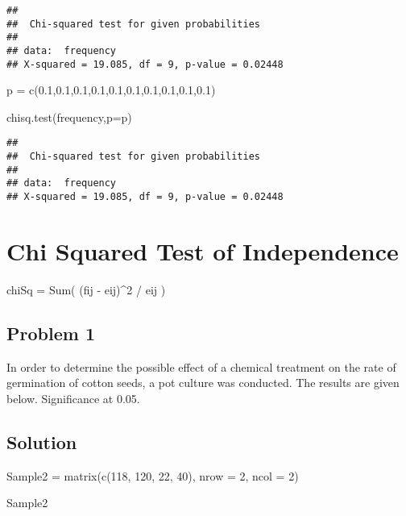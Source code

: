 \documentclass[
]{article}
\newenvironment{Shaded}{\begin{snugshade}}{\end{snugshade}}
\newcommand{\AttributeTok}[1]{\textcolor[rgb]{0.77,0.63,0.00}{#1}}
\newcommand{\DecValTok}[1]{\textcolor[rgb]{0.00,0.00,0.81}{#1}}
\newcommand{\FloatTok}[1]{\textcolor[rgb]{0.00,0.00,0.81}{#1}}
\newcommand{\FunctionTok}[1]{\textcolor[rgb]{0.00,0.00,0.00}{#1}}
\newcommand{\NormalTok}[1]{#1}
\newcommand{\OtherTok}[1]{\textcolor[rgb]{0.56,0.35,0.01}{#1}}
\begin{document}
\begin{verbatim}
## 
##  Chi-squared test for given probabilities
## 
## data:  frequency
## X-squared = 19.085, df = 9, p-value = 0.02448
\end{verbatim}

\begin{Shaded}
\begin{Highlighting}[]
\NormalTok{p }\OtherTok{=} \FunctionTok{c}\NormalTok{(}\FloatTok{0.1}\NormalTok{,}\FloatTok{0.1}\NormalTok{,}\FloatTok{0.1}\NormalTok{,}\FloatTok{0.1}\NormalTok{,}\FloatTok{0.1}\NormalTok{,}\FloatTok{0.1}\NormalTok{,}\FloatTok{0.1}\NormalTok{,}\FloatTok{0.1}\NormalTok{,}\FloatTok{0.1}\NormalTok{,}\FloatTok{0.1}\NormalTok{)}


\FunctionTok{chisq.test}\NormalTok{(frequency,}\AttributeTok{p=}\NormalTok{p)}
\end{Highlighting}
\end{Shaded}

\begin{verbatim}
## 
##  Chi-squared test for given probabilities
## 
## data:  frequency
## X-squared = 19.085, df = 9, p-value = 0.02448
\end{verbatim}

\hypertarget{chi-squared-test-of-independence}{%
\section{Chi Squared Test of
Independence}\label{chi-squared-test-of-independence}}

chiSq = Sum( (fij - eij)\^{}2 / eij )

\hypertarget{problem-1-3}{%
\subsection{Problem 1}\label{problem-1-3}}

In order to determine the possible effect of a chemical treatment on the
rate of germination of cotton seeds, a pot culture was conducted. The
results are given below. Significance at 0.05.

\hypertarget{solution-25}{%
\subsection{Solution}\label{solution-25}}

\begin{Shaded}
\begin{Highlighting}[]
\NormalTok{Sample2 }\OtherTok{=} \FunctionTok{matrix}\NormalTok{(}\FunctionTok{c}\NormalTok{(}\DecValTok{118}\NormalTok{, }\DecValTok{120}\NormalTok{, }\DecValTok{22}\NormalTok{, }\DecValTok{40}\NormalTok{), }\AttributeTok{nrow =} \DecValTok{2}\NormalTok{, }\AttributeTok{ncol =} \DecValTok{2}\NormalTok{)}

\NormalTok{Sample2}
\end{Highlighting}
\end{Shaded}
\end{document}
